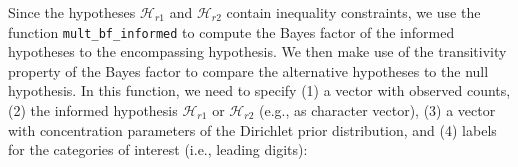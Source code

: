 \documentclass[
  english,
  man,floatsintext]{apa6}
\newenvironment{Shaded}{\begin{snugshade}}{\end{snugshade}}
\newcommand{\CommentTok}[1]{\textcolor[rgb]{0.56,0.35,0.01}{\textit{#1}}}
\newcommand{\DataTypeTok}[1]{\textcolor[rgb]{0.13,0.29,0.53}{#1}}
\newcommand{\DecValTok}[1]{\textcolor[rgb]{0.00,0.00,0.81}{#1}}
\newcommand{\KeywordTok}[1]{\textcolor[rgb]{0.13,0.29,0.53}{\textbf{#1}}}
\newcommand{\NormalTok}[1]{#1}
\newcommand{\OperatorTok}[1]{\textcolor[rgb]{0.81,0.36,0.00}{\textbf{#1}}}
\newcommand{\StringTok}[1]{\textcolor[rgb]{0.31,0.60,0.02}{#1}}
\begin{document}
\begin{Shaded}
\end{Shaded}

Since the hypotheses \(\mathcal{H}_{r1}\) and \(\mathcal{H}_{r2}\) contain inequality constraints, we use the function \texttt{mult\_bf\_informed} to compute the Bayes factor of the informed hypotheses to the encompassing hypothesis. We then make use of the transitivity property of the Bayes factor to compare the alternative hypotheses to the null hypothesis. In this function, we need to specify (1) a vector with observed counts, (2) the informed hypothesis \(\mathcal{H}_{r1}\) or \(\mathcal{H}_{r2}\) (e.g., as character vector), (3) a vector with concentration parameters of the Dirichlet prior distribution, and (4) labels for the categories of interest (i.e., leading digits):
\end{document}
